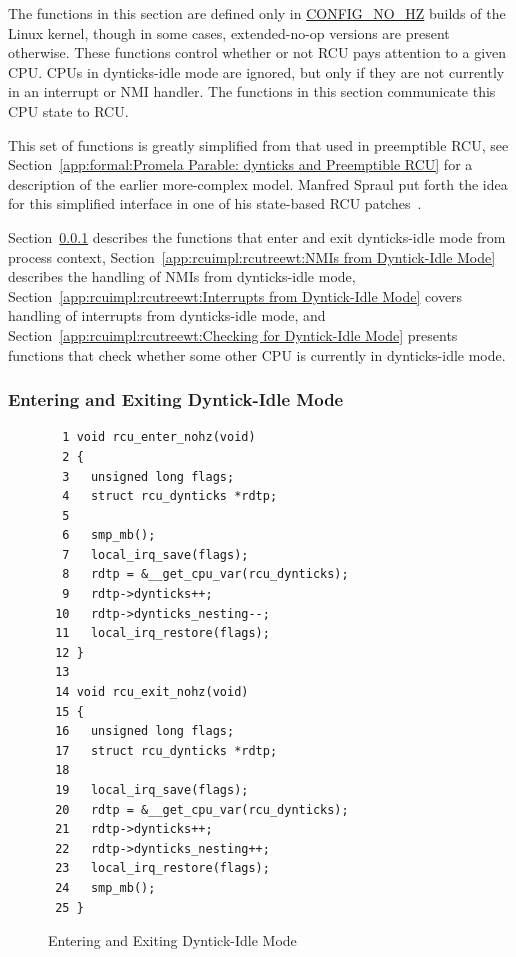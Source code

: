 The functions in this section are defined only in \url{CONFIG_NO_HZ}
builds of the Linux kernel,
though in some cases, extended-no-op versions are present otherwise.
These functions control whether or not RCU pays attention to a given CPU.
CPUs in dynticks-idle mode are ignored, but only if they are not
currently in an interrupt or NMI handler.
The functions in this section communicate this CPU state to RCU.

This set of functions is greatly simplified from that used in
preemptible RCU, see
Section~\ref{app:formal:Promela Parable: dynticks and Preemptible RCU}
for a description of the earlier more-complex model.
Manfred Spraul put forth the idea for this simplified interface in
one of his state-based RCU
patches~\cite{ManfredSpraul2008StateMachineRCU,ManfredSpraul2008dyntickIRQNMI}.

Section~\ref{app:rcuimpl:rcutreewt:Entering and Exiting Dyntick-Idle Mode}
describes the functions that enter and exit dynticks-idle mode from
process context,
Section~\ref{app:rcuimpl:rcutreewt:NMIs from Dyntick-Idle Mode}
describes the handling of NMIs from dynticks-idle mode,
Section~\ref{app:rcuimpl:rcutreewt:Interrupts from Dyntick-Idle Mode}
covers handling of interrupts from dynticks-idle mode, and
Section~\ref{app:rcuimpl:rcutreewt:Checking for Dyntick-Idle Mode}
presents functions that check whether some other CPU is currently in
dynticks-idle mode.

\subsubsection{Entering and Exiting Dyntick-Idle Mode}
\label{app:rcuimpl:rcutreewt:Entering and Exiting Dyntick-Idle Mode}

\begin{figure}[tbp]
{ \scriptsize
\begin{verbatim}
  1 void rcu_enter_nohz(void)
  2 {
  3   unsigned long flags;
  4   struct rcu_dynticks *rdtp;
  5
  6   smp_mb();
  7   local_irq_save(flags);
  8   rdtp = &__get_cpu_var(rcu_dynticks);
  9   rdtp->dynticks++;
 10   rdtp->dynticks_nesting--;
 11   local_irq_restore(flags);
 12 }
 13
 14 void rcu_exit_nohz(void)
 15 {
 16   unsigned long flags;
 17   struct rcu_dynticks *rdtp;
 18
 19   local_irq_save(flags);
 20   rdtp = &__get_cpu_var(rcu_dynticks);
 21   rdtp->dynticks++;
 22   rdtp->dynticks_nesting++;
 23   local_irq_restore(flags);
 24   smp_mb();
 25 }
\end{verbatim}
}
\caption{Entering and Exiting Dyntick-Idle Mode}
\label{fig:app:rcuimpl:rcutreewt:Entering and Exiting Dyntick-Idle Mode}
\end{figure}

